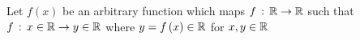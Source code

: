 \documentclass[ClusteringConnectionsMAIN.tex]{subfiles}
\begin{document}
	

  Let $f \left( x \right)$ be an arbitrary function which maps $f \, : \, \mathbb{R} \rightarrow \mathbb{R}$ such that $f \, : \, x \in \mathbb{R} \rightarrow y \in \mathbb{R}$ where $y = f \left( x \right) \in \mathbb{R}$ for $x, y \in \mathbb{R}$
\end{document}
